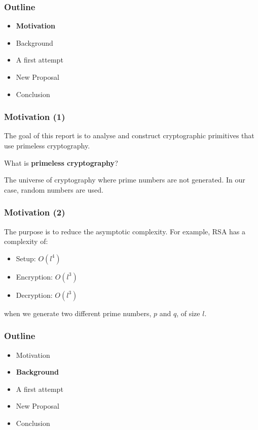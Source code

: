 \documentclass{beamer}
\begin{document}

\begin{frame}
\frametitle{Outline}

 	\begin{itemize}
		\item {\bf Motivation} 
		\item Background
		\item A first attempt
		\item New Proposal
		\item Conclusion
	\end{itemize}
\end{frame}



\begin{frame}
\frametitle{Motivation (1)}
    The goal of this report is to analyse and construct cryptographic primitives that use
    primeless cryptography. 
    
    \bigskip
    
    What is \textbf{primeless cryptography}?
    
    The universe of cryptography where prime numbers are not generated. In our case, 
    random numbers are used.
    	


\end{frame}


\begin{frame}
\frametitle{Motivation (2)}

	The purpose is to reduce the asymptotic complexity. For example, 
	RSA has a complexity of:
	
	\begin{itemize}
		\item Setup: $O(l^4)$
		\item Encryption: $O(l^3)$
		\item Decryption: $O(l^3)$	
	\end{itemize}
	when we generate two different prime numbers, $p$ and $q$, 
	of size $l$.
	
	
\end{frame}


\begin{frame}
\frametitle{Outline}

 	\begin{itemize}
		\item Motivation 
		\item \textbf{Background}
		\item A first attempt
		\item New Proposal
		\item Conclusion
	\end{itemize}
\end{frame}
\end{document}
